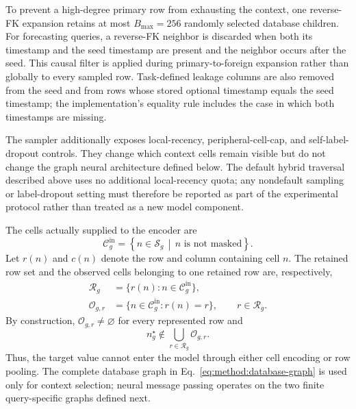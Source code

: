 To prevent a high-degree primary row from exhausting the context,
one reverse-FK expansion retains at most \(B_{\max}=256\) randomly selected
database children. For forecasting queries, a reverse-FK neighbor is
discarded when both its timestamp and the seed timestamp are present and
the neighbor occurs after the seed. This causal filter is applied during
primary-to-foreign expansion rather than globally to every sampled row.
Task-defined leakage columns are also removed from the seed and from rows
whose stored optional timestamp equals the seed timestamp; the
implementation's equality rule includes the case in which both timestamps
are missing.

The sampler additionally exposes local-recency, peripheral-cell-cap, and
self-label-dropout controls. They change which context cells remain visible
but do not change the graph neural architecture defined below. The default
hybrid traversal described above uses no additional local-recency quota;
any nondefault sampling or label-dropout setting must therefore be reported
as part of the experimental protocol rather than treated as a new model
component.

The cells actually supplied to the encoder are
\begin{equation}
  \mathcal C_g^{\mathrm{in}}
  =
  \left\{
    n\in\mathcal S_g
    \,\middle|\,
    n\text{ is not masked}
  \right\}.
\label{eq:method:input-cell-set}
\end{equation}
Let \(r(n)\) and \(c(n)\) denote the row and column containing cell \(n\).
The retained row set and the observed cells belonging to one retained row
are, respectively,
\begin{equation}
\begin{aligned}
  \mathcal R_g
  &=
  \{r(n):n\in\mathcal C_g^{\mathrm{in}}\},\\
  \mathcal O_{g,r}
  &=
  \{n\in\mathcal C_g^{\mathrm{in}}:r(n)=r\},
  \qquad r\in\mathcal R_g.
\end{aligned}
\label{eq:method:sampled-rows-and-cells}
\end{equation}
By construction, \(\mathcal O_{g,r}\neq\varnothing\) for every represented
row and
\begin{equation}
  n_g^\star
  \notin
  \bigcup_{r\in\mathcal R_g}\mathcal O_{g,r}.
\label{eq:method:target-exclusion}
\end{equation}
Thus, the target value cannot enter the model through either cell encoding
or row pooling. The complete database graph in
Eq.~\eqref{eq:method:database-graph} is used only for context selection;
neural message passing operates on the two finite query-specific graphs
defined next.

